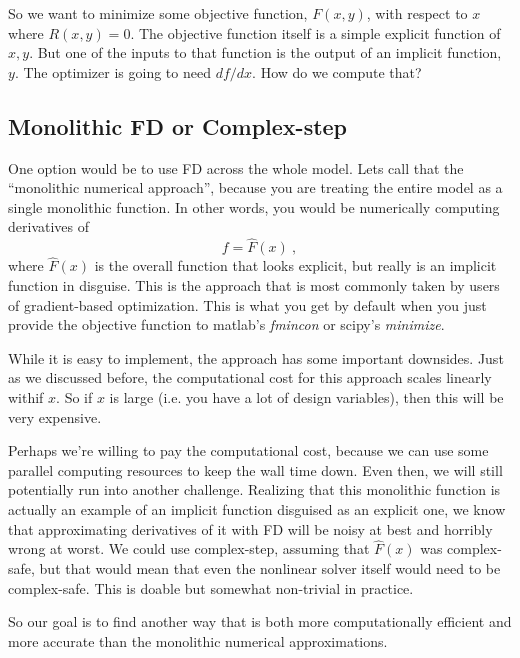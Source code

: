 \documentclass[conf]{new-aiaa}
\begin{document}
    So we want to minimize some objective function, $F(x,y)$, with respect to $x$ where $R(x,y)=0$. 
    The objective function itself is a simple explicit function of $x,y$. 
    But one of the inputs to that function is the output of an implicit function, $y$. 
    The optimizer is going to need $df/dx$. 
    How do we compute that? 


    \subsection{Monolithic FD or Complex-step}
    One option would be to use FD across the whole model. 
    Lets call that the ``monolithic numerical approach'', because you are treating the entire model as a single monolithic function. 
    In other words, you would be numerically computing derivatives of 
    \begin{equation}
        f= \hat{F}(x) \ , 
    \end{equation}
    where $\hat{F}(x)$ is the overall function that looks explicit, but really is an implicit function in disguise. 
    This is the approach that is most commonly taken by users of gradient-based optimization. 
    This is what you get by default when you just provide the objective function to matlab's \textit{fmincon} or scipy's \textit{minimize}.

    While it is easy to implement, the approach has some important downsides. 
    Just as we discussed before, the computational cost for this approach scales linearly withif $x$. 
    So if $x$ is large (i.e. you have a lot of design variables), then this will be very expensive. 
    
    Perhaps we're willing to pay the computational cost, because we can use some parallel computing resources to keep the wall time down. 
    Even then, we will still potentially run into another challenge. 
    Realizing that this monolithic function is actually an example of an implicit function disguised as an explicit one, 
    we know that approximating derivatives of it with FD will be noisy at best and horribly wrong at worst. 
    We could use complex-step, assuming that  $\hat{F}(x)$ was complex-safe, but that would mean that even the nonlinear solver itself would need to be complex-safe. 
    This is doable but somewhat non-trivial in practice. 
    
    So our goal is to find another way that is both more computationally efficient and more accurate than the monolithic numerical approximations. 
\end{document}
